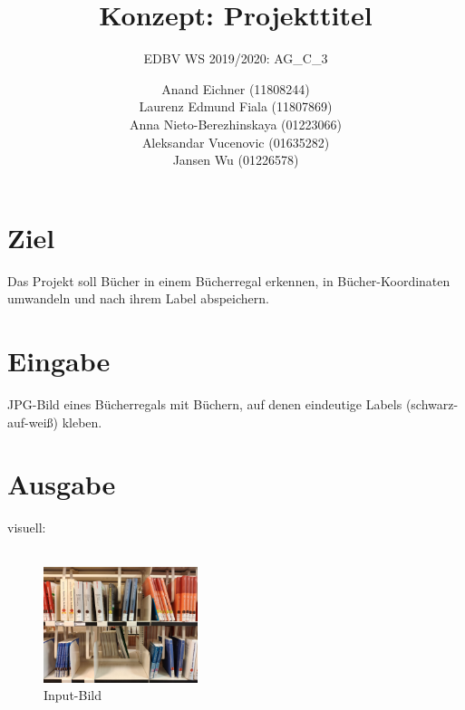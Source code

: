 \documentclass[deutsch]{scrartcl}
\begin{document}
\title{Konzept: Projekttitel} %

\subtitle{EDBV WS 2019/2020: AG\_C\_3} %


\author{Anand Eichner (11808244)\\
Laurenz Edmund Fiala (11807869)\\
Anna Nieto-Berezhinskaya (01223066)\\
Aleksandar Vucenovic (01635282)\\
Jansen Wu (01226578)}




\maketitle



\section{Ziel}
Das Projekt soll Bücher in einem Bücherregal erkennen, in Bücher-Koordinaten umwandeln und nach ihrem Label abspeichern.

\section{Eingabe}
JPG-Bild eines Bücherregals mit Büchern, auf denen eindeutige Labels (schwarz-auf-weiß) kleben.

\section{Ausgabe}
visuell:\\
\\
\begin{figure}[H]
 \centering
 \includegraphics[width=0.4\textwidth]{input.jpg}
 \caption{Input-Bild}
 \label{fig:img}
\end{figure}
\end{document}
